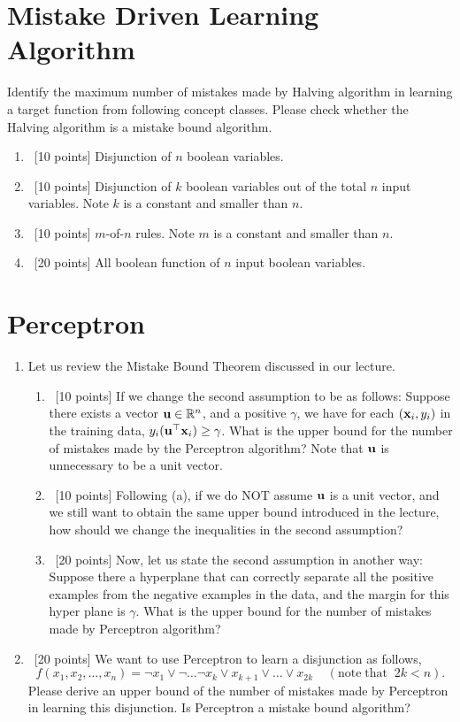 \documentclass[12pt, fullpage,letterpaper]{article}
\begin{document}
\section{Mistake Driven Learning Algorithm}
Identify the maximum number of mistakes made by Halving algorithm in learning a target function from following concept classes. Please check whether the Halving algorithm is a mistake bound algorithm.  
\begin{enumerate}
\item~[10 points] Disjunction of $n$ boolean variables. 
\item~[10 points] Disjunction of $k$ boolean variables out of the total $n$ input variables. Note $k$ is a constant and smaller than $n$. 
\item~[10 points] $m$-of-$n$ rules. Note $m$ is a constant and smaller than $n$.
\item~[20 points] All boolean function of $n$ input boolean variables. 
\end{enumerate}

\section{Perceptron}
\begin{enumerate}
\item  Let us review the Mistake Bound Theorem discussed in our lecture. 
\begin{enumerate}
	\item~[10 points] If we change the second assumption to be as follows: Suppose there exists a vector ${\bf u}\in \mathbb{R}^n$, and a positive $\gamma$, we have for each $({\bf x}_i, y_i)$ in the training data, $y_i({\bf u}^\top {\bf x}_i) \ge \gamma$. What is the upper bound for the number of mistakes made by the Perceptron algorithm?   Note that ${\bf u}$ is unnecessary to be a unit vector. 
	\item~[10 points] Following (a), if we do NOT assume ${\bf u}$ is a unit vector, and we still want to obtain the same upper bound introduced in the lecture, how should we change the inequalities in the second assumption?
	\item~[20 points]  Now, let us state the second assumption in another way: Suppose there a hyperplane that can correctly separate all the positive examples from the negative examples in the data, and the margin for this hyper plane is $\gamma$. What is the upper bound for the number of mistakes made by Perceptron algorithm?
\end{enumerate}

\item~[20 points] We want to use Perceptron to learn a disjunction as follows,
\[
f(x_1, x_2, \ldots, x_n) = \neg x_1 \lor \neg \ldots \neg x_k \lor x_{k+1} \lor \ldots \lor x_{2k} \;\;\;\;(\mathrm{note\; that}\;\; 2k < n).
\]
Please derive an upper bound of the number of mistakes made by Perceptron in learning this disjunction. Is Perceptron a mistake bound algorithm?
\end{enumerate}
\end{document}
